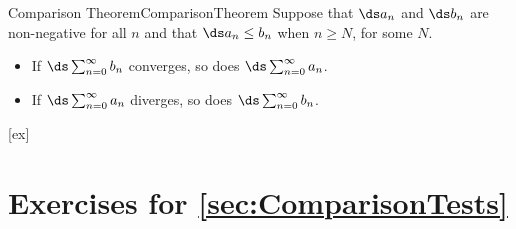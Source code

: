 \begin{theorem}{Comparison Theorem}{ComparisonTheorem}
Suppose that $\ds a_n$ and $\ds b_n$ are non-negative for all $n$ and
that $\ds a_n\le b_n$ when $n\ge N$, for some $N$.

\begin{itemize}
\item{} If $\ds\sum_{n=0}^\infty b_n$ converges, so does 
$\ds\sum_{n=0}^\infty a_n$.
\item{} If $\ds\sum_{n=0}^\infty a_n$ diverges, so does 
$\ds\sum_{n=0}^\infty b_n$.
\end{itemize}
\end{theorem}

[ex]
\section*{Exercises for \ref{sec:ComparisonTests}}

